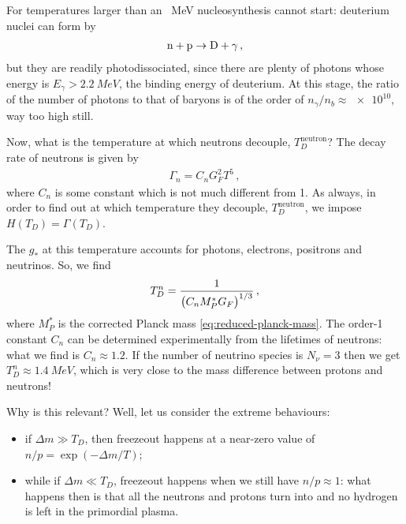 \documentclass[main.tex]{subfiles}
\begin{document}
For temperatures larger than an \SI{}{MeV} nucleosynthesis cannot start: deuterium nuclei can form by
%
\begin{align}
\ce{n} + \ce{p} \to \ce{D} + \gamma 
\,,
\end{align}
%
but they are readily photodissociated, since there are plenty of photons whose energy is \(E_\gamma > \SI{2.2}{MeV}\), the binding energy of deuterium.
At this stage, the ratio of the number of photons to that of baryons is of the order of \(n_\gamma / n_b \approx \num{e10}\), way too high still. 

Now, what is the temperature at which neutrons decouple, \(T^{\text{neutron}}_{D}\)? The decay rate of neutrons is given by 
%
\begin{align}
\Gamma_{n} = C_n G_F^2 T^{5}
\,,
\end{align}
%
where \(C_n\) is some constant which is not much different from 1. 
As always, in order to find out at which temperature they decouple, \(T^{\text{neutron}}_{D}\), we impose \(H (T_D) = \Gamma (T_D)\). 

The \(g_*\) at this temperature accounts for photons, electrons, positrons and neutrinos. So, we find 
%
\begin{align}
T^{n}_{D} = \frac{1}{\qty(C_n M_P^{*} G_F)^{1/3}}
\,,
\end{align}
%
where \(M_P^{*}\) is the corrected Planck mass \eqref{eq:reduced-planck-mass}. The order-1 constant \(C_n\) can be determined experimentally from the lifetimes of neutrons: what we find is \(C_n \approx \num{1.2}\).
If the number of neutrino species is \(N_\nu = 3\) then we get \(T^{n}_{D } \approx \SI{1.4}{MeV}\), which is very close to the mass difference between protons and neutrons! 

Why is this relevant? Well, let us consider the extreme behaviours: 
\begin{itemize}
    \item if \(\Delta m \gg T_D\), then freezeout happens at a near-zero value of \(n/p = \exp( - \Delta m / T)\);
    \item while if \(\Delta m \ll T_D\), freezeout happens when we still have \(n / p \approx 1\): what happens then is that all the neutrons and protons turn into  and no hydrogen is left in the primordial plasma. 
\end{itemize}


\end{document}
